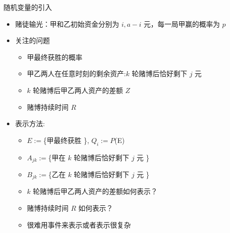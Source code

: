 \begin{frame}{随机变量的引入}
	\begin{itemize}[<+-|alert@+>]
		\item 赌徒输光：甲和乙初始资金分别为 $i, a-i$ 元，每一局甲赢的概率为 $p$%
		\item 关注的问题
		      \begin{itemize}[<+-|alert@+>]
			      \item 甲最终获胜的概率
			      \item 甲乙两人在任意时刻的剩余资产:$k$ 轮赌博后恰好剩下 $j$ 元
			      \item $k$ 轮赌博后甲乙两人资产的差额 $Z$
			      \item 赌博持续时间 $R$
		      \end{itemize}
		\item 表示方法:
		      \begin{itemize}[<+-|alert@+>]
			      \item $E:=$\{甲最终获胜 \}, $Q_i:=P$(E)
			      \item $A_{jk}:=$\{甲在 $k$ 轮赌博后恰好剩下 $j$ 元 \}
			      \item $B_{jk}:=$\{乙在 $k$ 轮赌博后恰好剩下 $j$ 元 \}
			      \item $k$ 轮赌博后甲乙两人资产的差额如何表示？
			      \item 赌博持续时间 $R$ 如何表示？
			      \item 很难用事件来表示或者表示很复杂
		      \end{itemize}

	\end{itemize}

\end{frame}


